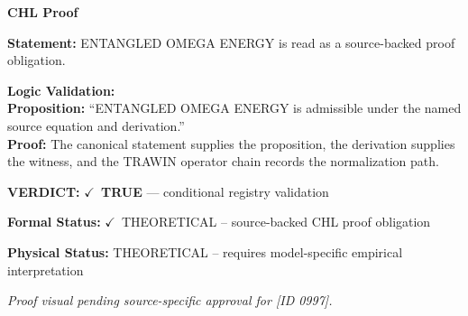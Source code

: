 \vspace{0.45em}
\noindent\textbf{CHL Proof}\par
\textbf{Statement:} ENTANGLED OMEGA ENERGY is read as a source-backed proof obligation.

\textbf{Logic Validation:}\\
\textbf{Proposition:} ``ENTANGLED OMEGA ENERGY is admissible under the named source equation and derivation.''\\
\textbf{Proof:} The canonical statement supplies the proposition, the derivation supplies the witness, and the TRAWIN operator chain records the normalization path.

\textbf{VERDICT:} \ensuremath{\checkmark}\ \textbf{TRUE} --- conditional registry validation

\textbf{Formal Status:} \ensuremath{\checkmark}\ THEORETICAL -- source-backed CHL proof obligation

\textbf{Physical Status:} THEORETICAL -- requires model-specific empirical interpretation
\par\vspace{0.45em}
\par
\vfill
\begingroup\footnotesize\itshape
Proof visual pending source-specific approval for [ID 0997].
\par\endgroup
\vfill
\endgroup
\endgroup
